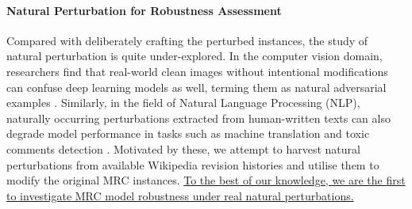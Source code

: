 \paragraph{Natural Perturbation for Robustness Assessment} Compared with deliberately crafting the perturbed instances, the study of natural perturbation is quite under-explored. In the computer vision domain, researchers find that real-world clean images without intentional modifications can confuse deep learning models as well, terming them as natural adversarial examples \citep{Hendrycks_2021_CVPR, Pedraza2022-yo}. Similarly, in the field of Natural Language Processing (NLP), naturally occurring perturbations extracted from human-written texts can also degrade model performance in tasks such as machine translation \citep{belinkov2018synthetic} and toxic comments detection \citep{le-etal-2022-perturbations}.
Motivated by these, we attempt to harvest natural perturbations from available Wikipedia revision histories and utilise them to modify the original MRC instances.
\uline{To the best of our knowledge, we are the first to investigate MRC model robustness under real natural perturbations.}